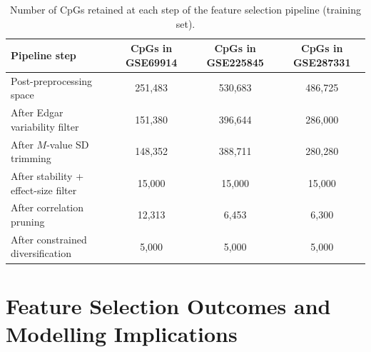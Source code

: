 \begin{table}[t]
\centering
\scriptsize
\caption{Number of CpGs retained at each step of the feature selection pipeline (training set).}
\label{tab:fs_reduction_steps_all}
\begin{tabular}{l c c c}
\toprule
Pipeline step 
& CpGs in GSE69914 
& CpGs in GSE225845 
& CpGs in GSE287331 \\
\midrule
Post-preprocessing space           & 251{,}483 & 530{,}683 & 486{,}725 \\
After Edgar variability filter     & 151{,}380 & 396{,}644 & 286{,}000 \\
After $M$-value SD trimming        & 148{,}352 & 388{,}711 & 280{,}280 \\
After stability + effect-size filter
                                   & 15{,}000  & 15{,}000  & 15{,}000  \\
After correlation pruning          & 12{,}313  & 6{,}453   & 6{,}300  \\
After constrained diversification  & 5{,}000   & 5{,}000   & 5{,}000   \\
\bottomrule
\end{tabular}
\end{table}


\section{Feature Selection Outcomes and Modelling Implications}
\label{sec:fs_conclusion}

